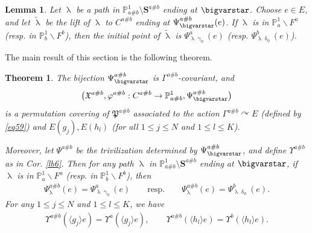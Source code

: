 \documentclass[11pt,b5paper,notitlepage]{article}
\theoremstyle{definition}
\theoremstyle{plain}
\newtheorem{thm}[df]{Theorem}
\newtheorem{lm}[df]{Lemma}
\newcommand{\fk}{\mathfrak}
\newcommand{\wtd}{\widetilde}
\newcommand{\bk}[1]{\langle {#1}\rangle}
\newcommand{\Pbb}{\mathbb P}
\newcommand{\Sbf}{\mathbf{S}}
\numberwithin{equation}{subsection}
\begin{document}
\begin{lm}\label{lb33}
Let $\uplambda$ be a path in $\Pbb^1_{a\#b}\setminus\Sbf^{a\#b}$ ending at $\bigvarstar$. Choose $e\in E$, and let $\wtd\uplambda$ be the lift of $\uplambda$ to $C^{a\#b}$ ending at $\Psi_\bigvarstar^{a\#b}(e)$. If $\uplambda$ is in $\Pbb^1_a\backslash F^a$ (resp. in $\Pbb^1_b\backslash F^b$), then the initial point of $\wtd\uplambda$ is $\Psi^a_{\uplambda\upgamma_0}(e)$ (resp. $\Psi^b_{\uplambda\updelta_0}(e)$).
\end{lm}



The main result of this section is the following theorem.

\begin{thm}\label{lb46}
The bijection $\Psi^{a\#b}_\bigvarstar$ is $\Gamma^{a\#b}$-covariant, and 
\begin{align*}
\big(\fk X^{a\#b},\varphi^{a\#b}:C^{a\#b}\rightarrow\Pbb^1_{a\#b},\Psi^{a\#b}_\bigvarstar\big)	
\end{align*}
is a permutation covering of $\fk P^{a\#b}$ associated to the action $\Gamma^{a\#b}\curvearrowright E$ (defined by \eqref{eq59}) and $E(g_j),E(h_l)$ (for all $1\leq j\leq N$ and $1\leq l\leq K$). 

Moreover, let $\Psi^{a\#b}$ be the trivilization determined by $\Psi^{a\#b}_\bigvarstar$, and define $\Upsilon^{a\#b}$ as in Cor. \ref{lb6}.  Then for any path $\uplambda$ in $\Pbb^1_{a\#b}\setminus\Sbf^{a\#b}$ ending at $\bigvarstar$, if $\uplambda$ is in $\Pbb^1_a\backslash F^a$ (resp. in $\Pbb^1_b\backslash F^b$), then
\begin{align}
\Psi_\uplambda^{a\#b}(e)=\Psi^a_{\uplambda\upgamma_0}(e)\qquad\text{resp.}\qquad\Psi_\uplambda^{a\#b}(e)=\Psi^b_{\uplambda\updelta_0}(e).\label{eq62}
\end{align}
For any $1\leq j\leq N$ and $1\leq l\leq K$, we have
\begin{align}
\Upsilon^{a\#b}(\bk{g_j}e)=\Upsilon^a(\bk{g_j}e),\qquad 	\Upsilon^{a\#b}(\bk{h_l}e)=\Upsilon^b(\bk{h_l}e).\label{eq63}
\end{align}
\end{thm}
\end{document}
